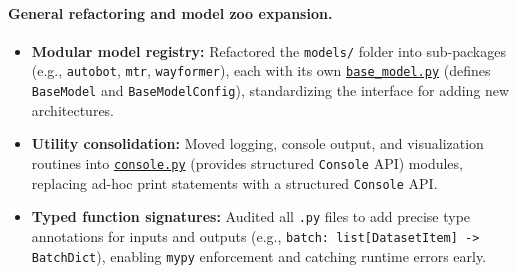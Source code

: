 \paragraph{General refactoring and model zoo expansion.}
\begin{itemize}[leftmargin=*]
  \item \textbf{Modular model registry:} Refactored the \texttt{models/} folder into sub-packages (e.g., \texttt{autobot}, \texttt{mtr}, \texttt{wayformer}), each with its own \href{https://github.com/JanDuchscherer104/UniTraj/blob/main/unitraj/models/base_model/base_model.py}{\texttt{base\_model.py}} (defines \texttt{BaseModel} and \texttt{BaseModelConfig}), standardizing the interface for adding new architectures.
  \item \textbf{Utility consolidation:} Moved logging, console output, and visualization routines into \href{https://github.com/JanDuchscherer104/UniTraj/blob/main/unitraj/utils/console.py}{\texttt{console.py}} (provides structured \texttt{Console} API) modules, replacing ad-hoc print statements with a structured \texttt{Console} API.
  \item \textbf{Typed function signatures:} Audited all \texttt{.py} files to add precise type annotations for inputs and outputs (e.g., \texttt{batch: list[DatasetItem] -> BatchDict}), enabling \texttt{mypy} enforcement and catching runtime errors early.
\end{itemize}

\newpage